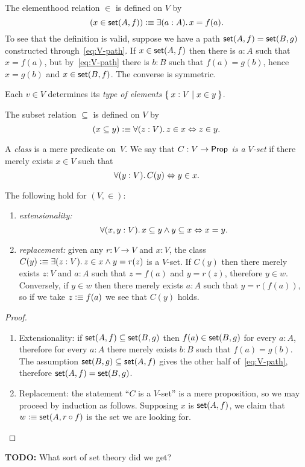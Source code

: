 The elementhood relation $\in$ is defined on $V$ by
%
\begin{equation*}
  (x \in \vset(A,f)) \defeq \exis{a : A} x = f(a).
\end{equation*}
%
To see that the definition is valid, suppose we have a path $\mathsf{set}(A, f) = \mathsf{set}(B, g)$
constructed through~\eqref{eq:V-path}. If $x \in \mathsf{set}(A,f)$ then there is $a : A$ such
that $x = f(a)$, but by~\eqref{eq:V-path} there is $b : B$ such that $f(a) = g(b)$, hence
$x = g(b)$ and $x \in \mathsf{set}(B,f)$. The converse is symmetric.

Each $v \in V$ determines its \emph{type of elements} $\Set{ x : V | x \in y }$.

The subset relation $\subseteq$ is defined on $V$ by
%
\begin{equation*}
  (x \subseteq y) \defeq \fall{z : V} z \in x \Leftrightarrow z \in y.
\end{equation*}

A \emph{class} is a mere predicate on~$V$. We say that \emph{$C : V \to \mathsf{Prop}$ is a
  $V$-set} if there merely exists $x \in V$ such that
%
\begin{equation*}
  \fall{y : V} C(y) \Leftrightarrow y \in x.
\end{equation*}

\begin{thm}
  The following hold for $(V, {\in})$:
  \begin{enumerate}
  \item \emph{extensionality:}
    \begin{equation*}
      \fall{x, y : V} x \subseteq y \land y \subseteq x \Leftrightarrow x = y.
    \end{equation*}
  \item \emph{replacement:} given any $r : V \to V$ and $x : V$, the class $C(y) \defeq
    \exis{z : V} z \in x \land y = r(z)$ is a $V$-set. If $C(y)$ then there merely exists
    $z : V$ and $a : A$ such that $z = f(a)$ and $y = r(z)$, therefore $y \in w$.
    Conversely, if $y \in w$ then there merely exists $a : A$ such that $y = r(f(a))$, so
    if we take $z \vcentcolon\equiv f(a)$ we see that $C(y)$ holds.
  \end{enumerate}
\end{thm}


\begin{proof}
  \mbox{}
  \begin{enumerate}
  \item Extensionality: if $\mathsf{set}(A,f) \subseteq \mathsf{set}(B, g)$ then $f(a) \in \mathsf{set}(B, g)$
    for every $a : A$, therefore for every $a : A$ there merely exists $b : B$ such that
    $f(a) = g(b)$. The assumption $\mathsf{set}(B, g) \subseteq \mathsf{set}(A, f)$ gives the other half
    of~\eqref{eq:V-path}, therefore $\mathsf{set}(A,f) = \mathsf{set}(B,g)$.

  \item Replacement: the statement ``$C$ is a $V$-set'' is a mere proposition, so we may
    proceed by induction as follows. Supposing $x$ is $\mathsf{set}(A, f)$, we claim that $w
    \vcentcolon\equiv \mathsf{set}(A, r \circ f)$ is the set we are looking for.

  \end{enumerate}
\end{proof}

\textbf{TODO:} What sort of set theory did we get?




